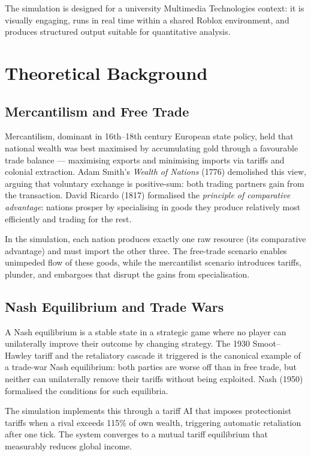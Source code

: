 \documentclass[12pt,a4paper]{article}
\begin{document}
The simulation is designed for a university Multimedia Technologies context: it is visually engaging, runs in real time within a shared Roblox environment, and produces structured output suitable for quantitative analysis.

\section{Theoretical Background}

\subsection{Mercantilism and Free Trade}

Mercantilism, dominant in 16th--18th century European state policy, held that national wealth was best maximised by accumulating gold through a favourable trade balance --- maximising exports and minimising imports via tariffs and colonial extraction. Adam Smith's \textit{Wealth of Nations} (1776) demolished this view, arguing that voluntary exchange is positive-sum: both trading partners gain from the transaction. David Ricardo (1817) formalised the \textit{principle of comparative advantage}: nations prosper by specialising in goods they produce relatively most efficiently and trading for the rest.

In the simulation, each nation produces exactly one raw resource (its comparative advantage) and must import the other three. The free-trade scenario enables unimpeded flow of these goods, while the mercantilist scenario introduces tariffs, plunder, and embargoes that disrupt the gains from specialisation.

\subsection{Nash Equilibrium and Trade Wars}

A Nash equilibrium is a stable state in a strategic game where no player can unilaterally improve their outcome by changing strategy. The 1930 Smoot--Hawley tariff and the retaliatory cascade it triggered is the canonical example of a trade-war Nash equilibrium: both parties are worse off than in free trade, but neither can unilaterally remove their tariffs without being exploited. Nash (1950) formalised the conditions for such equilibria.

The simulation implements this through a tariff AI that imposes protectionist tariffs when a rival exceeds 115\% of own wealth, triggering automatic retaliation after one tick. The system converges to a mutual tariff equilibrium that measurably reduces global income.
\end{document}
